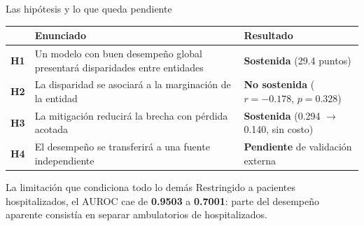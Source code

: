 \documentclass[aspectratio=169,11pt]{beamer}
\newcommand{\resalta}[1]{{\color{vino}\bfseries #1}}
\newcommand{\cifra}[1]{{\color{naranja}\bfseries #1}}
\begin{document}
\begin{frame}{Las hipótesis y lo que queda pendiente}
  \vspace{0.2em}
  \centering
  \renewcommand{\arraystretch}{1.10}
  {\scriptsize
  \begin{tabular}{p{0.9cm} p{7.4cm} p{3.9cm}}
    \toprule
    & \textbf{Enunciado} & \textbf{Resultado}\\
    \midrule
    \textcolor{naranja}{\bfseries H1} & Un modelo con buen desempeño global
      presentará disparidades entre entidades & \resalta{Sostenida}
      (29.4 puntos)\\
    \textcolor{naranja}{\bfseries H2} & La disparidad se asociará a la
      marginación de la entidad & \resalta{No sostenida}
      ($r=-0.178$, $p=0.328$)\\
    \textcolor{naranja}{\bfseries H3} & La mitigación reducirá la brecha con
      pérdida acotada & \resalta{Sostenida} (0.294 $\to$ 0.140, sin costo)\\
    \textcolor{naranja}{\bfseries H4} & El desempeño se transferirá a una fuente
      independiente & \resalta{Pendiente} de validación externa\\
    \bottomrule
  \end{tabular}}

  \vspace{0.7em}
  \begin{center}
  \begin{minipage}{0.92\textwidth}
    \begin{block}{La limitación que condiciona todo lo demás}
      \centering\footnotesize
      Restringido a pacientes hospitalizados, el AUROC cae de \cifra{0.9503} a
      \cifra{0.7001}: parte del desempeño aparente consistía en separar
      ambulatorios de hospitalizados.
    \end{block}
  \end{minipage}
  \end{center}
\end{frame}
\end{document}
